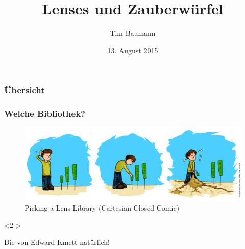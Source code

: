 \documentclass{beamer}
\title[Lens]{Lenses und Zauberwürfel}
\author{Tim Baumann}
\institute[CCA]{Curry Club Augsburg}
\date{13. August 2015}
\begin{document}
\begin{frame}
  \titlepage
\end{frame}

\iffalse
\begin{frame}
  \frametitle{Übersicht}
  \tableofcontents
\end{frame}

\begin{frame}[fragile,t]
  \frametitle{Welche Bibliothek?}
  \begin{figure}
    \includegraphics[width=0.9\linewidth]{images/ccc-picking-lens-library.png}
    \caption{Picking a Lens Library (Cartesian Closed Comic)}
  \end{figure}
  \begin{visibleenv}<2->
    \begin{center}
      \begin{minipage}{0.65\textwidth}
        Die von Edward Kmett natürlich! %

         \\
         \\
         \\
         \\
      \end{minipage}
    \end{center}
  \end{visibleenv}
\end{frame}
\end{document}
